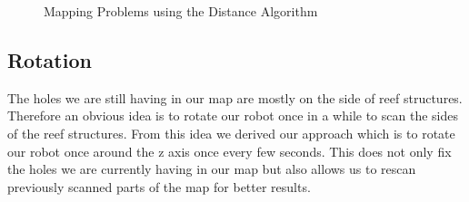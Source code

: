 \documentclass[twoside, 12pt]{article}
\begin{document}
\begin{figure}
\vspace{-28pt}
  \begin{center}
  \end{center}
\vspace{-20pt}
  \caption{Mapping Problems using the Distance Algorithm}
  \label{fig:secondMappingProblems}
\vspace{20pt}
\end{figure}

\begin{figure}
\vspace{-50pt}
\end{figure}

\subsection{Rotation}
The holes we are still having in our map are mostly on the side of reef structures. Therefore an obvious idea is to rotate our robot once in a while to scan the sides of the reef structures. From this idea we derived our approach which is to rotate our robot once around the z axis once every few seconds. This does not only fix the holes we are currently having in our map but also allows us to rescan previously scanned parts of the map for better results. 
\end{document}
